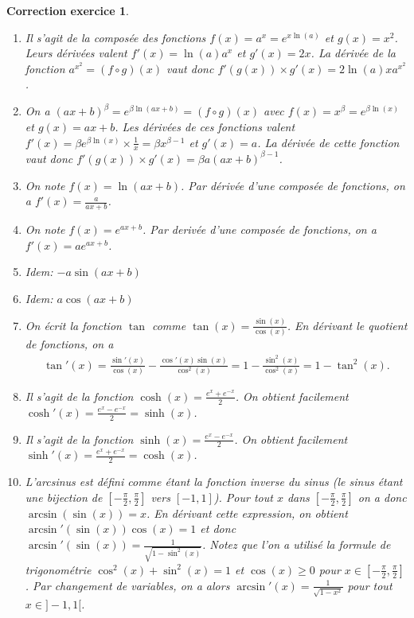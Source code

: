 \documentclass[12pt]{article}
\newtheorem{correction}{\bf Correction exercice}
\newenvironment{cor}{
\begin{correction}\smallskip\normalfont}{\end{correction}
}
\newif\ifcorrige\corrigetrue
\begin{document}
\ifcorrige
\color{magenta}
\begin{cor}
$\qquad$
\begin{enumerate}
\item Il s'agit de la compos\'ee des fonctions $f(x) = a^x = e^{x \ln(a)}$ et $g(x) = x^2$.
  Leurs d\'eriv\'ees valent $f'(x) = \ln(a) a^x$ et $g'(x) = 2x$.
  La d\'eriv\'ee de la fonction $a^{x^2} = (f \circ g)(x)$ vaut donc
  $f'(g(x)) \times g'(x) = 2 \ln(a) x a^{x^2}$.

\item On a $(ax+b)^{\beta} = e^{\beta \ln(ax+b) } = (f \circ g)(x)$
  avec $f(x) = x^{\beta} = e^{\beta \ln(x)}$ et $g(x) = ax+b$.
  Les d\'eriv\'ees de ces fonctions valent
  $f'(x) = \beta e^{\beta \ln(x)} \times \frac1x = \beta x^{\beta - 1}$
  et $g'(x) = a$.
  La d\'eriv\'ee de cette fonction vaut donc
  $f'(g(x)) \times g'(x) = \beta a (ax+b)^{\beta - 1}$.

\item On note $f(x) = \ln(ax+b)$.
  Par d\'eriv\'ee d'une compos\'ee de fonctions, on a $f'(x) = \frac{a}{ax+b}$.

\item On note $f(x) = e^{ax+b}$. Par deriv\'ee d'une compos\'ee de fonctions, on a
  $f'(x) = a e^{ax+b}$.

\item Idem:
  $- a \sin(ax+b)$

\item Idem: $a \cos(ax+b)$

\item On \'ecrit la fonction $\tan$ comme $\tan(x) = \frac{\sin(x)}{\cos(x)}$.
  En d\'erivant le quotient de fonctions, on a
  \begin{align*}
    \tan'(x) = \frac{\sin'(x)}{\cos(x)} - \frac{\cos'(x)\sin(x)}{\cos^2(x)}
    = 1 - \frac{\sin^2(x)}{\cos^2(x)} = 1 - \tan^2(x) .
  \end{align*}

\item Il s'agit de la fonction $\cosh(x) = \frac{e^x + e^{-x}}{2}$.
  On obtient facilement $\cosh'(x) = \frac{e^x - e^{-x}}{2} = \sinh(x)$.

\item Il s'agit de la fonction $\sinh(x) = \frac{e^x - e^{-x}}{2}$.
  On obtient facilement $\sinh'(x) = \frac{e^x + e^{-x}}{2} = \cosh(x)$.

\item L'arcsinus est d\'efini comme \'etant la fonction inverse du sinus
  (le sinus \'etant une bijection de $[-\frac{\pi}2,\frac{\pi}2]$ vers $[-1,1]$).
  Pour tout $x$ dans $[-\frac{\pi}2,\frac{\pi}2]$ on a donc $\arcsin(\sin(x)) = x$.
  En d\'erivant cette expression, on obtient
  $\arcsin'(\sin(x)) \cos(x) = 1$
  et donc
  $\arcsin'(\sin(x)) = \frac{1}{\sqrt{1-\sin^2(x)}}$.
  Notez que l'on a utilis\'e la formule de trigonom\'etrie $\cos^2(x) + \sin^2(x) = 1$
  et $\cos(x) \geq 0$ pour $x \in [-\frac{\pi}2,\frac{\pi}2]$.
  Par changement de variables, on a alors
  $\arcsin'(x) = \frac{1}{\sqrt{1-x^2}}$ pour tout $x \in ]-1,1[$.


\end{enumerate}
\end{cor}
\end{document}
